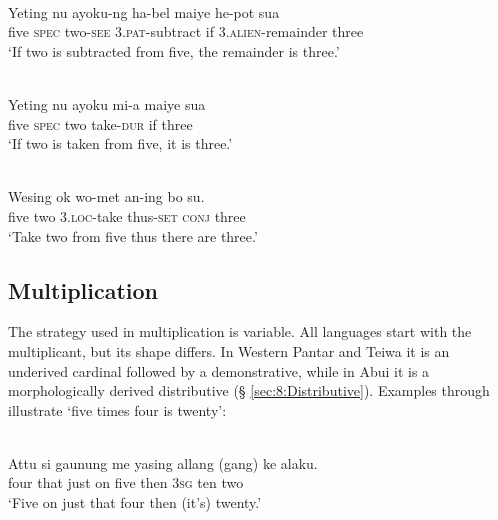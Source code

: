 \ea
\label{ex:8:1242}
\\
 \gll Yeting  nu  ayoku-ng  ha-bel  maiye  he-pot  sua\\
  five  \textsc{spec}   two-\textsc{see } 3.\textsc{pat}{}-subtract  if  \textsc{3.alien}{}-remainder  three \\
 \glt `If two is subtracted from five, the remainder is three.' 
\z 
  
\ea
\label{ex:8:1243}
\\
 \gll Yeting  nu  ayoku  mi-a  maiye  sua\\
  five  \textsc{spec } two  take-\textsc{dur } if  three   \\
 \glt `If two is taken from five, it is three.' 
\z
 
  

\ea%
\label{bkm:Ref358115306}
  
\\
\gll  Wesing  ok  wo-met  an-ing  bo  su.   \\  
    five  two   3.\textsc{loc-}take  thus\textsc{{}-set}  \textsc{conj} three   \\
\glt `Take two from five thus there are three.' 
\z



 

 

\subsection{Multiplication}
\label{sec:8:Multiplication}
The strategy used in multiplication is variable. All languages start with the multiplicant, but its shape differs. In Western Pantar and Teiwa it is an underived cardinal followed by a demonstrative, while in Abui it is a morphologically derived distributive ({\S} \ref{sec:8:Distributive}). Examples  through   illustrate `five times four is twenty':


\ea%
\label{bkm:Ref358043144}
  
\\
\gll Attu  si  gaunung  me  yasing   allang  (gang)  ke alaku. \\  
   four  that  just  on  five  then  3\textsc{sg } ten two   \\
\glt `Five on just that four then (it's) twenty.'
\z


